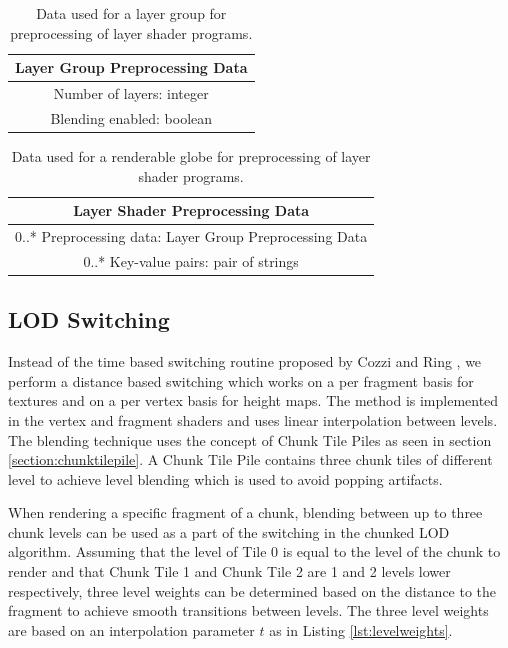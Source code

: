 \begin{table}
\centering 
\caption[]{Data used for a layer group for preprocessing of layer shader programs.}
\label{table:layergrouppreprocessingdata}
\begin{tabular}{ c }    
    	\hline
        \textbf{Layer Group Preprocessing Data} \\ 
    	\hline
	Number of layers: integer \\
    	Blending enabled: boolean \\
	\hline
\end{tabular}
\end{table}

\begin{table}
\centering
\caption[]{Data used for a renderable globe for preprocessing of layer shader programs.}
\label{table:layergrouppreprocessingdata}
\begin{tabular}{ c }
    
    	\hline
        \textbf{Layer Shader Preprocessing Data} \\ 
    	\hline
	0..* Preprocessing data: Layer Group Preprocessing Data \\
    	0..* Key-value pairs: pair of strings \\
    	\hline
    
\end{tabular}
\end{table}

\subsection{LOD Switching}
\label{section:lodswitching}
Instead of the time based switching routine proposed by Cozzi and Ring \cite{cozzi11}, we perform a distance based switching which works on a per fragment basis for textures and on a per vertex basis for height maps. The method is implemented in the vertex and fragment shaders and uses linear interpolation between levels. The blending technique uses the concept of Chunk Tile Piles as seen in section \ref{section:chunktilepile}. A Chunk Tile Pile contains three chunk tiles of different level to achieve level blending which is used to avoid popping artifacts. 

When rendering a specific fragment of a chunk, blending between up to three chunk levels can be used as a part of the switching in the chunked LOD algorithm. Assuming that the level of Tile 0 is equal to the level of the chunk to render and that Chunk Tile 1 and Chunk Tile 2 are 1 and 2 levels lower respectively, three level weights can be determined based on the distance to the fragment to achieve smooth transitions between levels. The three level weights are based on an interpolation parameter $t$ as in Listing \ref{lst:levelweights}.

